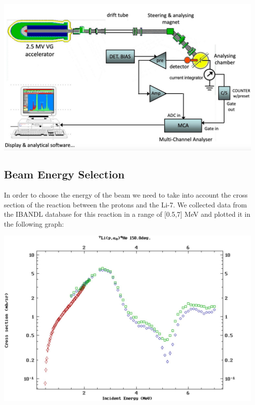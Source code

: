 \documentclass{article}
\begin{document}
\begin{multicols}{2}
\begin{center}
    \label{TT_21}
    \centering
    \includegraphics[scale = 0.15]{images/scheme.jpeg}
\end{center}

\subsection{Beam Energy Selection}
    \label{sec:beamenergyselection}

In order to choose the energy of the beam we need to take into account the cross section of the reaction between the protons and the Li-7. We collected data from the IBANDL database for this reaction in a range of [0.5,7] MeV and plotted it in the following graph:

\begin{center}
    \label{TT_21}
    \centering
    \includegraphics[scale = 0.17]{images/Li_crosssection_energy.jpeg}
\end{center}


\end{multicols}
\end{document}
